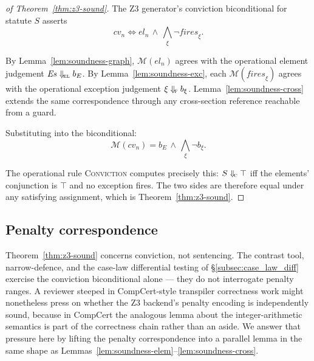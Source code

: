 \begin{proof}[of Theorem~\ref{thm:z3-sound}]
The Z3 generator's conviction biconditional for statute $S$
asserts
\[
  \mathit{cv}_n \Leftrightarrow
  \mathit{el}_n \,\wedge\,
  \bigwedge_\xi \neg \mathit{fires}_\xi.
\]

By Lemma~\ref{lem:soundness-graph}, $\mathcal{M}(\mathit{el}_n)$
agrees with the operational element judgement
$\mathit{Es} \Downarrow_{\!\textsc{el}} b_E$. By
Lemma~\ref{lem:soundness-exc}, each $\mathcal{M}(\mathit{fires}_\xi)$
agrees with the operational exception judgement $\xi
\Downarrow_{\!\textsc{f}} b_\xi$.
Lemma~\ref{lem:soundness-cross} extends the same correspondence
through any cross-section reference reachable from a guard.

Substituting into the biconditional:
\[
  \mathcal{M}(\mathit{cv}_n) =
  b_E \,\wedge\, \bigwedge_\xi \neg b_\xi.
\]

The operational rule \textsc{Conviction} computes precisely
this: $S \Downarrow_{\!\textsc{c}} \top$ iff the elements'
conjunction is $\top$ and no exception fires. The two sides are
therefore equal under any satisfying assignment, which is
Theorem~\ref{thm:z3-sound}.
\end{proof}

\subsection{Penalty correspondence}
\label{subsec:soundness-penalty}

Theorem~\ref{thm:z3-sound} concerns conviction, not sentencing.
The contrast tool, narrow-defence, and the case-law differential
testing of \S\ref{subsec:case_law_diff} exercise the conviction
biconditional alone --- they do not interrogate penalty ranges.
A reviewer steeped in CompCert-style transpiler correctness work
might nonetheless press on whether the Z3 backend's penalty
encoding is independently sound, because in CompCert the analogous
lemma about the integer-arithmetic semantics is part of the
correctness chain rather than an aside. We answer that pressure
here by lifting the penalty correspondence into a parallel lemma
in the same shape as Lemmas~\ref{lem:soundness-elem}--\ref{lem:soundness-cross}.

